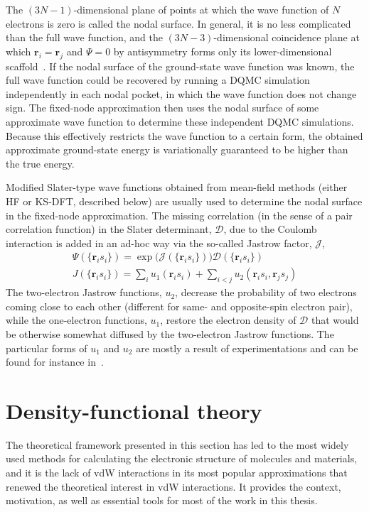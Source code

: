 The $(3N-1)$-dimensional plane of points at which the wave function of $N$ electrons is zero is called the nodal surface.
In general, it is no less complicated than the full wave function, and the $(3N-3)$-dimensional coincidence plane at which $\mathbf r_i=\mathbf r_j$ and $\Psi=0$ by antisymmetry forms only its lower-dimensional scaffold~\cite{CeperleyJSP91}.
If the nodal surface of the ground-state wave function was known, the full wave function could be recovered by running a DQMC simulation independently in each nodal pocket, in which the wave function does not change sign.
The fixed-node approximation then uses the nodal surface of some approximate wave function to determine these independent DQMC simulations.
Because this effectively restricts the wave function to a certain form, the obtained approximate ground-state energy is variationally guaranteed to be higher than the true energy.

Modified Slater-type wave functions obtained from mean-field methods (either HF or KS-DFT, described below) are usually used to determine the nodal surface in the fixed-node approximation.
The missing correlation (in the sense of a pair correlation function) in the Slater determinant, $\mathcal D$, due to the Coulomb interaction is added in an ad-hoc way via the so-called Jastrow factor, $\mathcal J$,
\begin{equation}
\begin{gathered}
  \Psi(\{\mathbf r_i s_i\})=\exp\big(\mathcal J(\{\mathbf r_i s_i\})\!\big)\mathcal D(\{\mathbf r_i s_i\}) \\
  J(\{\mathbf r_i s_i\})=\sum_i u_1(\mathbf r_i s_i)+\sum_{i<j} u_2(\mathbf r_i s_i,\mathbf r_j s_j)
\end{gathered}
\end{equation}
The two-electron Jastrow functions, $u_2$, decrease the probability of two electrons coming close to each other (different for same- and opposite-spin electron pair), while the one-electron functions, $u_1$, restore the electron density of $\mathcal D$ that would be otherwise somewhat diffused by the two-electron Jastrow functions.
The particular forms of $u_1$ and $u_2$ are mostly a result of experimentations and can be found for instance in~\cite{FoulkesRMP01}.

\section{Density-functional theory}

The theoretical framework presented in this section has led to the most widely used methods for calculating the electronic structure of molecules and materials, and it is the lack of vdW interactions in its most popular approximations that renewed the theoretical interest in vdW interactions.
It provides the context, motivation, as well as essential tools for most of the work in this thesis.


